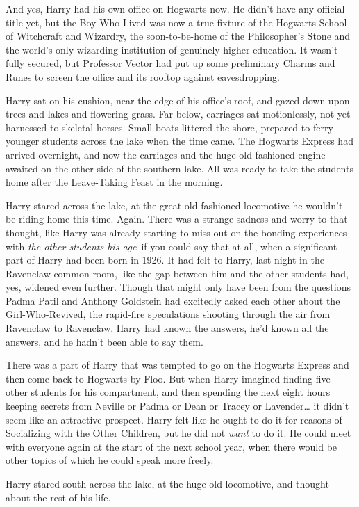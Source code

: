 And yes, Harry had his own office on Hogwarts now. He didn't have any official title yet, but the Boy-Who-Lived was now a true fixture of the Hogwarts School of Witchcraft and Wizardry, the soon-to-be-home of the Philosopher's Stone and the world's only wizarding institution of genuinely higher education. It wasn't fully secured, but Professor Vector had put up some preliminary Charms and Runes to screen the office and its rooftop against eavesdropping.

Harry sat on his cushion, near the edge of his office's roof, and gazed down upon trees and lakes and flowering grass. Far below, carriages sat motionlessly, not yet harnessed to skeletal horses. Small boats littered the shore, prepared to ferry younger students across the lake when the time came. The Hogwarts Express had arrived overnight, and now the carriages and the huge old-fashioned engine awaited on the other side of the southern lake. All was ready to take the students home after the Leave-Taking Feast in the morning.

Harry stared across the lake, at the great old-fashioned locomotive he wouldn't be riding home this time. Again. There was a strange sadness and worry to that thought, like Harry was already starting to miss out on the bonding experiences with \emph{the other students his age}\---if you could say that at all, when a significant part of Harry had been born in 1926. It had felt to Harry, last night in the Ravenclaw common room, like the gap between him and the other students had, yes, widened even further. Though that might only have been from the questions Padma Patil and Anthony Goldstein had excitedly asked each other about the Girl-Who-Revived, the rapid-fire speculations shooting through the air from Ravenclaw to Ravenclaw. Harry had known the answers, he'd known all the answers, and he hadn't been able to say them.

There was a part of Harry that was tempted to go on the Hogwarts Express and then come back to Hogwarts by Floo. But when Harry imagined finding five other students for his compartment, and then spending the next eight hours keeping secrets from Neville or Padma or Dean or Tracey or Lavender{\ldots} it didn't seem like an attractive prospect. Harry felt like he ought to do it for reasons of Socializing with the Other Children, but he did not \emph{want} to do it. He could meet with everyone again at the start of the next school year, when there would be other topics of which he could speak more freely.

Harry stared south across the lake, at the huge old locomotive, and thought about the rest of his life.

